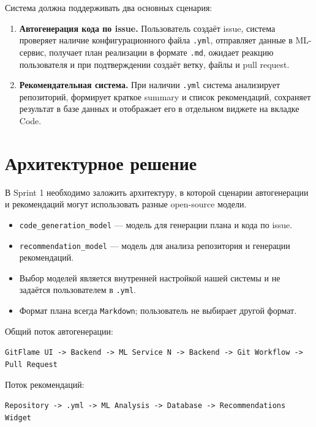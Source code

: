 \documentclass[12pt,a4paper]{article}
\begin{document}
Система должна поддерживать два основных сценария:

\begin{enumerate}
    \item \textbf{Автогенерация кода по issue.}
    Пользователь создаёт issue, система проверяет наличие конфигурационного файла \texttt{.yml}, отправляет данные в ML-сервис, получает план реализации в формате \texttt{.md}, ожидает реакцию пользователя и при подтверждении создаёт ветку, файлы и pull request.

    \item \textbf{Рекомендательная система.}
    При наличии \texttt{.yml} система анализирует репозиторий, формирует краткое summary и список рекомендаций, сохраняет результат в базе данных и отображает его в отдельном виджете на вкладке Code.
\end{enumerate}

\section{Архитектурное решение}

В Sprint 1 необходимо заложить архитектуру, в которой сценарии автогенерации и рекомендаций могут использовать разные open-source модели.

\begin{itemize}
    \item \texttt{code\_generation\_model} --- модель для генерации плана и кода по issue.
    \item \texttt{recommendation\_model} --- модель для анализа репозитория и генерации рекомендаций.
    \item Выбор моделей является внутренней настройкой нашей системы и не задаётся пользователем в \texttt{.yml}.
    \item Формат плана всегда \texttt{Markdown}; пользователь не выбирает другой формат.
\end{itemize}

Общий поток автогенерации:

\begin{center}
\texttt{GitFlame UI -> Backend -> ML Service N -> Backend -> Git Workflow -> Pull Request}
\end{center}

Поток рекомендаций:

\begin{center}
\texttt{Repository -> .yml -> ML Analysis -> Database -> Recommendations Widget}
\end{center}
\end{document}
